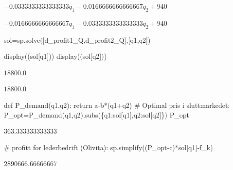 \documentclass[
  12pt,
  a4paper,
  DIV=11,
  numbers=noendperiod]{scrartcl}
\newenvironment{Shaded}{\begin{snugshade}}{\end{snugshade}}
\newcommand{\CommentTok}[1]{\textcolor[rgb]{0.37,0.37,0.37}{#1}}
\newcommand{\ControlFlowTok}[1]{\textcolor[rgb]{0.00,0.23,0.31}{#1}}
\newcommand{\KeywordTok}[1]{\textcolor[rgb]{0.00,0.23,0.31}{#1}}
\newcommand{\NormalTok}[1]{\textcolor[rgb]{0.00,0.23,0.31}{#1}}
\newcommand{\OperatorTok}[1]{\textcolor[rgb]{0.37,0.37,0.37}{#1}}
\begin{document}
$\displaystyle - 0.0333333333333333 q_{1} - 0.0166666666666667 q_{2} + 940$

$\displaystyle - 0.0166666666666667 q_{1} - 0.0333333333333333 q_{2} + 940$

\begin{Shaded}
\begin{Highlighting}[]
\NormalTok{sol}\OperatorTok{=}\NormalTok{sp.solve([d\_profit1\_Q,d\_profit2\_Q],[q1,q2])}

\NormalTok{display((sol[q1]))}
\NormalTok{display((sol[q2]))}
\end{Highlighting}
\end{Shaded}

$\displaystyle 18800.0$

$\displaystyle 18800.0$

\begin{Shaded}
\begin{Highlighting}[]
\KeywordTok{def}\NormalTok{ P\_demand(q1,q2):}
    \ControlFlowTok{return}\NormalTok{ a}\OperatorTok{{-}}\NormalTok{b}\OperatorTok{*}\NormalTok{(q1}\OperatorTok{+}\NormalTok{q2)}
\CommentTok{\# Optimal pris i sluttmarkedet:}
\NormalTok{P\_opt}\OperatorTok{=}\NormalTok{P\_demand(q1,q2).subs(\{q1:sol[q1],q2:sol[q2]\})}
\NormalTok{P\_opt}
\end{Highlighting}
\end{Shaded}

$\displaystyle 363.333333333333$

\begin{Shaded}
\begin{Highlighting}[]
\CommentTok{\# profitt for lederbedrift (Olivita):}
\NormalTok{sp.simplify((P\_opt}\OperatorTok{{-}}\NormalTok{c)}\OperatorTok{*}\NormalTok{sol[q1]}\OperatorTok{{-}}\NormalTok{f\_k)}
\end{Highlighting}
\end{Shaded}

$\displaystyle 2890666.66666667$
\end{document}
